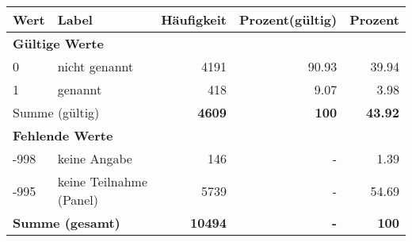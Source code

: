      \begin{longtable}{lXrrr}
     \toprule
     \textbf{Wert} & \textbf{Label} & \textbf{Häufigkeit} & \textbf{Prozent(gültig)} & \textbf{Prozent} \\
     \endhead
     \midrule
     \multicolumn{5}{l}{\textbf{Gültige Werte}}\\

     0 &
     \multicolumn{1}{X}{ nicht genannt   } &


       \num{4191} &
       \num[round-mode=places,round-precision=2]{90,93} &
         \num[round-mode=places,round-precision=2]{39,94} \\

     1 &
     \multicolumn{1}{X}{ genannt   } &


       \num{418} &
       \num[round-mode=places,round-precision=2]{9,07} &
         \num[round-mode=places,round-precision=2]{3,98} \\
     \midrule
     \multicolumn{2}{l}{Summe (gültig)} &
       \textbf{\num{4609}} &
     \textbf{100} &
       \textbf{\num[round-mode=places,round-precision=2]{43,92}} \\
     \multicolumn{5}{l}{\textbf{Fehlende Werte}}\\
       -998 &
       keine Angabe &
         \num{146} &
        - &
         \num[round-mode=places,round-precision=2]{1,39} \\
       -995 &
       keine Teilnahme (Panel) &
         \num{5739} &
        - &
         \num[round-mode=places,round-precision=2]{54,69} \\
     \midrule
     \multicolumn{2}{l}{\textbf{Summe (gesamt)}} &
          \textbf{\num{10494}} &
        \textbf{-} &
        \textbf{100} \\
     \bottomrule
     \end{longtable}
     
